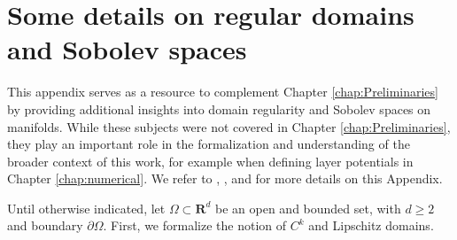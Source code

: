 \chapter{Some details on regular domains and Sobolev spaces}\label{appendix_truea}

This appendix serves as a resource to complement Chapter \ref{chap:Preliminaries} by providing additional insights into domain regularity and Sobolev spaces on manifolds. While these subjects were not covered in Chapter \ref{chap:Preliminaries}, they play an important role in the formalization and understanding of the broader context of this work, for example when defining layer potentials in Chapter \ref{chap:numerical}. We refer to \cite{salsa2016partial}, \cite{necas2011direct}, and \cite{wloka1987partial} for more details on this Appendix.

Until otherwise indicated, let \(\Omega \subset \mathbf{R}^d\) be an open and bounded set, with \(d \geq 2\) and boundary \(\partial\Omega\). First, we formalize the notion of \(C^k\) and Lipschitz domains.


